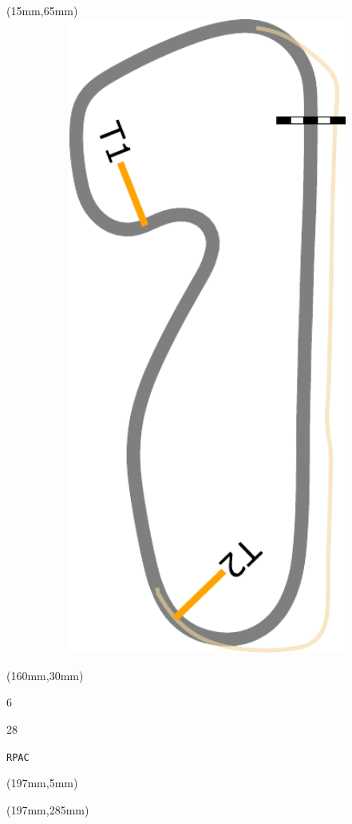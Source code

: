 \begin{textblock*}{185mm}(15mm,65mm)%
\centering
\mbox{\includegraphics[width=185mm,height=210mm,keepaspectratio]{PT/RPAC.pdf}}
\end{textblock*}
\begin{textblock*}{40mm}(160mm,30mm)%
\Large
\par{} 
\par6 
\par28 
\par\hfill\tiny\tt RPAC\\
\end{textblock*}
\begin{textblock*}{20mm}(197mm,5mm)%
\fbox{\thepage}
\label{RPAC}
\end{textblock*}
\begin{textblock*}{20mm}(197mm,285mm)%
\fbox{\thepage}
\end{textblock*}

